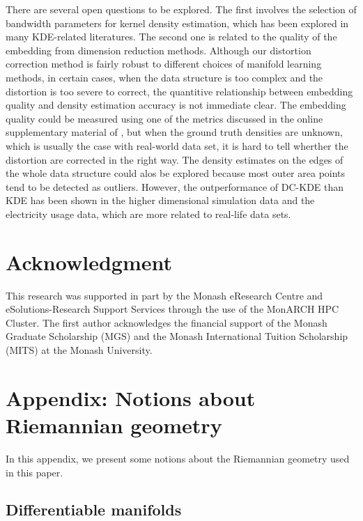 \documentclass[11pt,a4paper,]{article}
\begin{document}
There are several open questions to be explored. The first involves the selection of bandwidth parameters for kernel density estimation, which has been explored in many KDE-related literatures. The second one is related to the quality of the embedding from dimension reduction methods. Although our distortion correction method is fairly robust to different choices of manifold learning methods, in certain cases, when the data structure is too complex and the distortion is too severe to correct, the quantitive relationship between embedding quality and density estimation accuracy is not immediate clear. The embedding quality could be measured using one of the metrics discussed in the online supplementary material of \textcite{Cheng2021-dh}, but when the ground truth densities are unknown, which is usually the case with real-world data set, it is hard to tell wherther the distortion are corrected in the right way. The density estimates on the edges of the whole data structure could alos be explored because most outer area points tend to be detected as outliers. However, the outperformance of DC-KDE than KDE has been shown in the higher dimensional simulation data and the electricity usage data, which are more related to real-life data sets.

\hypertarget{acknowledgment}{%
\section*{Acknowledgment}\label{acknowledgment}}

This research was supported in part by the Monash eResearch Centre and eSolutions-Research Support Services through the use of the MonARCH HPC Cluster. The first author acknowledges the financial support of the Monash Graduate Scholarship (MGS) and the Monash International Tuition Scholarship (MITS) at the Monash University.

\appendix

\hypertarget{riemgeo}{%
\section{Appendix: Notions about Riemannian geometry}\label{riemgeo}}

In this appendix, we present some notions about the Riemannian geometry used in this paper.

\hypertarget{differentiable-manifolds}{%
\subsection{Differentiable manifolds}\label{differentiable-manifolds}}
\end{document}
